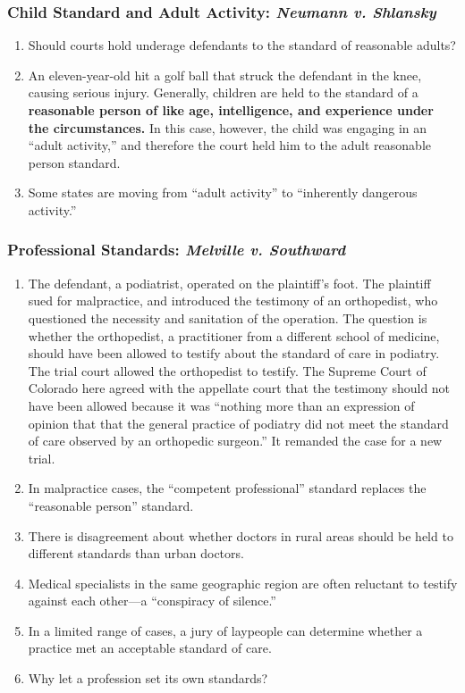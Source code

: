 \subsubsection{Child Standard and Adult Activity: \emph{Neumann v. Shlansky}}

\begin{enumerate}
    \item Should courts hold underage defendants to the standard of reasonable adults?
    \item An eleven-year-old hit a golf ball that struck the defendant in the knee, causing serious injury. Generally, children are held to the standard of a \textbf{reasonable person of like age, intelligence, and experience under the circumstances.} In this case, however, the child was engaging in an ``adult activity,'' and therefore the court held him to the adult reasonable person standard.
    \item Some states are moving from ``adult activity'' to ``inherently dangerous activity.''
\end{enumerate}

\subsubsection{Professional Standards: \emph{Melville v. Southward}}

\begin{enumerate}
    \item The defendant, a podiatrist, operated on the plaintiff's foot. The plaintiff sued for malpractice, and introduced the testimony of an orthopedist, who questioned the necessity and sanitation of the operation. The question is whether the orthopedist, a practitioner from a different school of medicine, should have been allowed to testify about the standard of care in podiatry. The trial court allowed the orthopedist to testify. The Supreme Court of Colorado here agreed with the appellate court that the testimony should not have been allowed because it was ``nothing more than an expression of opinion that that the general practice of podiatry did not meet the standard of care observed by an orthopedic surgeon.'' It remanded the case for a new trial.
    \item In malpractice cases, the ``competent professional'' standard replaces the ``reasonable person'' standard.
    \item There is disagreement about whether doctors in rural areas should be held to different standards than urban doctors.
    \item Medical specialists in the same geographic region are often reluctant to testify against each other---a ``conspiracy of silence.''
    \item In a limited range of cases, a jury of laypeople can determine whether a practice met an acceptable standard of care.
    \item Why let a profession set its own standards?
\end{enumerate}

